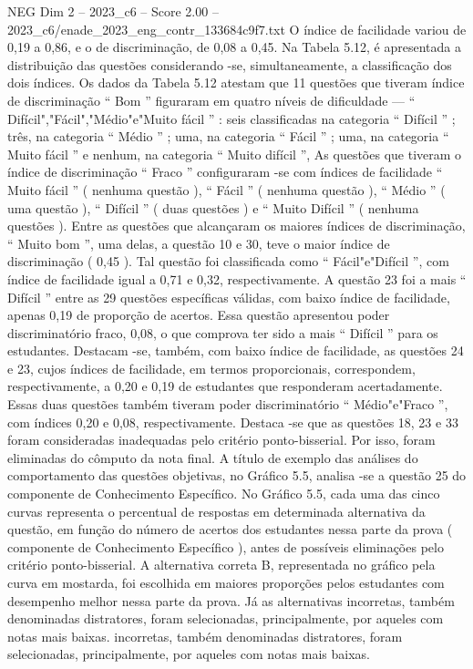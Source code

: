 \begin{textsample}{NEG Dim 2 – 2023\_c6 – Score 2.00 – 2023\_c6/enade\_2023\_eng\_contr\_133684c9f7.txt}
O índice de facilidade variou de 0,19 a 0,86, e o de discriminação, de 0,08 a 0,45.
Na Tabela 5.12, é apresentada a distribuição das questões considerando -se, simultaneamente, a classificação dos dois índices.
Os dados da Tabela 5.12 atestam que 11 questões que tiveram índice de discriminação “ Bom ” figuraram em quatro níveis de dificuldade — “ Difícil","Fácil","Médio"e"Muito fácil ” : seis classificadas na categoria “ Difícil ” ; três, na categoria “ Médio ” ; uma, na categoria “ Fácil ” ; uma, na categoria “ Muito fácil ” e nenhum, na categoria “ Muito difícil ”, As questões que tiveram o índice de discriminação “ Fraco ” configuraram -se com índices de facilidade “ Muito fácil ” ( nenhuma questão ), “ Fácil ” ( nenhuma questão ), “ Médio ” ( uma questão ), “ Difícil ” ( duas questões ) e “ Muito Difícil ” ( nenhuma questões ).
Entre as questões que alcançaram os maiores índices de discriminação, “ Muito bom ”, uma delas, a questão 10 e 30, teve o maior índice de discriminação ( 0,45 ).
Tal questão foi classificada como “ Fácil"e"Difícil ”, com índice de facilidade igual a 0,71 e 0,32, respectivamente.
A questão 23 foi a mais “ Difícil ” entre as 29 questões específicas válidas, com baixo índice de facilidade, apenas 0,19 de proporção de acertos.
Essa questão apresentou poder discriminatório fraco, 0,08, o que comprova ter sido a mais “ Difícil ” para os estudantes.
Destacam -se, também, com baixo índice de facilidade, as questões 24 e 23, cujos índices de facilidade, em termos proporcionais, correspondem, respectivamente, a 0,20 e 0,19 de estudantes que responderam acertadamente.
Essas duas questões também tiveram poder discriminatório “ Médio"e"Fraco ”, com índices 0,20 e 0,08, respectivamente.
Destaca -se que as questões 18, 23 e 33 foram consideradas inadequadas pelo critério ponto-bisserial.
Por isso, foram eliminadas do cômputo da nota final.
A título de exemplo das análises do comportamento das questões objetivas, no Gráfico 5.5, analisa -se a questão 25 do componente de Conhecimento Específico.
No Gráfico 5.5, cada uma das cinco curvas representa o percentual de respostas em determinada alternativa da questão, em função do número de acertos dos estudantes nessa parte da prova ( componente de Conhecimento Específico ), antes de possíveis eliminações pelo critério ponto-bisserial.
A alternativa correta B, representada no gráfico pela curva em mostarda, foi escolhida em maiores proporções pelos estudantes com desempenho melhor nessa parte da prova.
Já as alternativas incorretas, também denominadas distratores, foram selecionadas, principalmente, por aqueles com notas mais baixas. incorretas, também denominadas distratores, foram selecionadas, principalmente, por aqueles com notas mais baixas.

\end{textsample}
